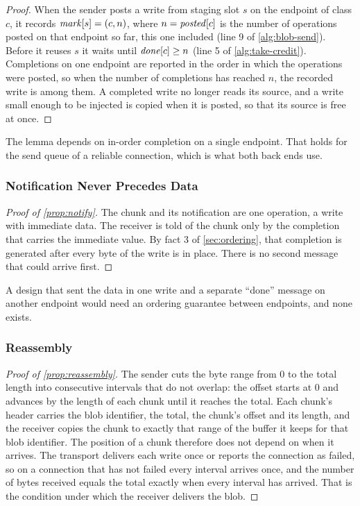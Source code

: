 \begin{proof}
When the sender posts a write from staging slot $s$ on the endpoint of class
$c$, it records $\mathit{mark}[s] = (c, n)$, where $n = \mathit{posted}[c]$ is the
number of operations posted on that endpoint so far, this one included
(line 9 of \cref{alg:blob-send}). Before it reuses $s$ it waits until
$\mathit{done}[c] \ge n$ (line 5 of \cref{alg:take-credit}). Completions on one
endpoint are reported in the order in which the operations were posted, so
when the number of completions has reached $n$, the recorded write is among
them. A completed write no longer reads its source, and a write small enough
to be injected is copied when it is posted, so that its source is free at
once.
\end{proof}

The lemma depends on in-order completion on a single endpoint. That holds
for the send queue of a reliable connection, which is what both back ends
use.

\subsubsection{Notification Never Precedes Data}

\begin{proof}[Proof of \cref{prop:notify}]
The chunk and its notification are one operation, a write with immediate
data. The receiver is told of the chunk only by the completion that carries
the immediate value. By fact 3 of \cref{sec:ordering}, that completion is
generated after every byte of the write is in place. There is no second
message that could arrive first.
\end{proof}

A design that sent the data in one write and a separate ``done'' message on
another endpoint would need an ordering guarantee between endpoints, and
none exists.

\subsubsection{Reassembly}

\begin{proof}[Proof of \cref{prop:reassembly}]
The sender cuts the byte range from $0$ to the total length into consecutive
intervals that do not overlap: the offset starts at $0$ and advances by the
length of each chunk until it reaches the total. Each chunk's header carries
the blob identifier, the total, the chunk's offset and its length, and the
receiver copies the chunk to exactly that range of the buffer it keeps for
that blob identifier. The position of a chunk therefore does not depend on
when it arrives. The transport delivers each write once or reports the
connection as failed, so on a connection that has not failed every interval
arrives once, and the number of bytes received equals the total exactly when
every interval has arrived. That is the condition under which the receiver
delivers the blob.
\end{proof}

